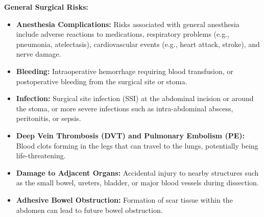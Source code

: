 \textbf{General Surgical Risks:}
\begin{itemize}
  \item \textbf{Anesthesia Complications:} Risks associated with general anesthesia include adverse reactions to medications, respiratory problems (e.g., pneumonia, atelectasis), cardiovascular events (e.g., heart attack, stroke), and nerve damage.
  
  \item \textbf{Bleeding:} Intraoperative hemorrhage requiring blood transfusion, or postoperative bleeding from the surgical site or stoma.
  
  \item \textbf{Infection:} Surgical site infection (SSI) at the abdominal incision or around the stoma, or more severe infections such as intra-abdominal abscess, peritonitis, or sepsis.
  
  \item \textbf{Deep Vein Thrombosis (DVT) and Pulmonary Embolism (PE):} Blood clots forming in the legs that can travel to the lungs, potentially being life-threatening.
  
  \item \textbf{Damage to Adjacent Organs:} Accidental injury to nearby structures such as the small bowel, ureters, bladder, or major blood vessels during dissection.
  
  \item \textbf{Adhesive Bowel Obstruction:} Formation of scar tissue within the abdomen can lead to future bowel obstruction.
\end{itemize}


